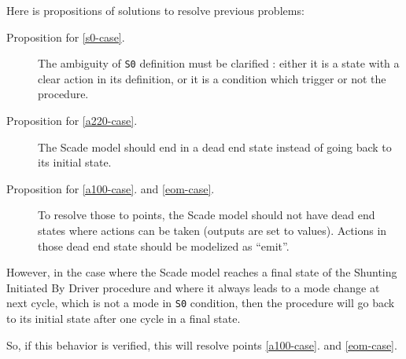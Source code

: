 Here is propositions of solutions to resolve previous problems:
\begin{description}
\item[Proposition for \ref{s0-case}.] The ambiguity of \texttt{S0} definition must be
  clarified : either it is a state with a clear action in its
  definition, or it is a condition which trigger or not the procedure.
\item[Proposition for \ref{a220-case}.] The Scade model should end in a
  dead end state instead of going back to its initial state.
\item[Proposition for \ref{a100-case}. and \ref{eom-case}.] To resolve those to points, the Scade
  model should not have dead end states where actions can be taken
  (outputs are set to values). Actions in those dead end state should
  be modelized as ``emit''. 
\end{description}


However, in the case where the Scade model reaches a final state of
the Shunting Initiated By Driver procedure and where it always leads
to a mode change at next cycle, which is not a mode in \texttt{S0}
condition, then the procedure will go back to its initial state after
one cycle in a final state.

So, if this behavior is verified, this will resolve points
\ref{a100-case}. and \ref{eom-case}.








